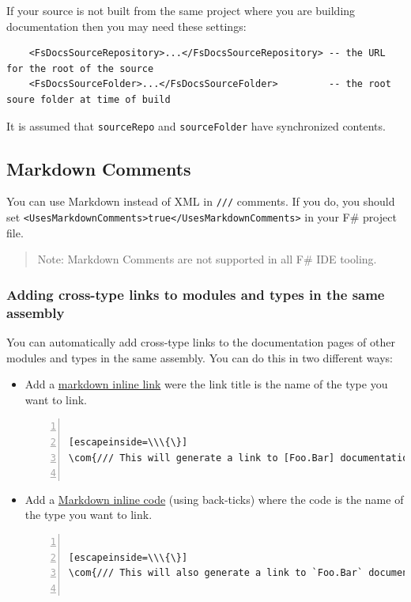 \documentclass{article}
\newcommand{\com}[1]{\textcolor{officegreen}{#1}}
\begin{document}
If your source is not built from the same project where you are building documentation then
you may need these settings:
\begin{lstlisting}
    <FsDocsSourceRepository>...</FsDocsSourceRepository> -- the URL for the root of the source
    <FsDocsSourceFolder>...</FsDocsSourceFolder>         -- the root soure folder at time of build

\end{lstlisting}


It is assumed that \texttt{sourceRepo} and \texttt{sourceFolder} have synchronized contents.
\subsection*{Markdown Comments}



You can use Markdown instead of XML in \texttt{///} comments. If you do, you should set \texttt{<UsesMarkdownComments>true</UsesMarkdownComments>} in
your F\# project file.
\begin{quote}


Note: Markdown Comments are not supported in all F\# IDE tooling.
\end{quote}

\subsubsection*{Adding cross-type links to modules and types in the same assembly}



You can automatically add cross-type links to the documentation pages of other modules and types in the same assembly.
You can do this in two different ways:
\begin{itemize}
\item 

Add a \href{https://github.com/adam-p/markdown-here/wiki/Markdown-Cheatsheet\#links}{markdown inline link} were the link
title is the name of the type you want to link.
\begin{lstlisting}[numbers=left]

[escapeinside=\\\{\}]
\com{/// This will generate a link to [Foo.Bar] documentation}


\end{lstlisting}


\item 

Add a \href{https://github.com/adam-p/markdown-here/wiki/Markdown-Cheatsheet\#code}{Markdown inline code} (using
back-ticks) where the code is the name of the type you want to link.
\begin{lstlisting}[numbers=left]

[escapeinside=\\\{\}]
\com{/// This will also generate a link to `Foo.Bar` documentation}


\end{lstlisting}


\end{itemize}
\end{document}
